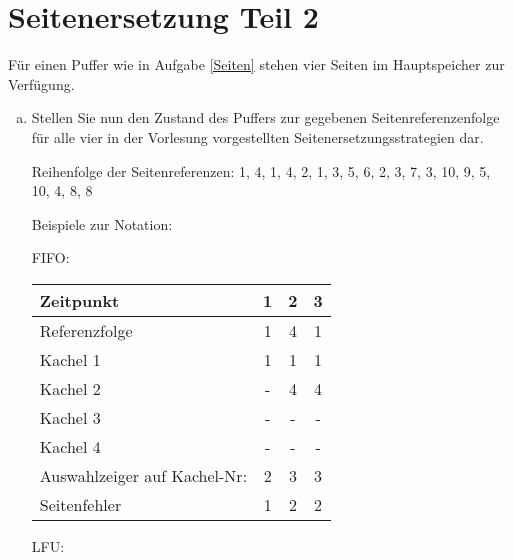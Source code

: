 \section{Seitenersetzung Teil 2}
Für einen Puffer wie in Aufgabe \ref{Seiten} stehen vier Seiten im Hauptspeicher zur Verfügung.
\begin{enumerate}[a)]
	\item Stellen Sie nun den Zustand des Puffers zur gegebenen Seitenreferenzenfolge für alle vier in der Vorlesung vorgestellten Seitenersetzungsstrategien dar.

	Reihenfolge der Seitenreferenzen: 1, 4, 1, 4, 2, 1, 3, 5, 6, 2, 3, 7, 3, 10, 9, 5, 10, 4, 8, 8

\begin{normalText}
	Beispiele zur Notation:


	\begin{minipage}{.49\textwidth}
		FIFO:

		\vspace{.25cm}

		\begin{tabular}{|p{4.3cm}||c|c|c|}
			\hline
			\rowcolor{gray} Zeitpunkt & 1 & 2 & 3 \\
			\hline
			\rowcolor{gray} Referenzfolge & 1 & 4 & 1 \\
			\hline \hline
			Kachel 1 & 1 & 1 & 1 \\
			\hline
			Kachel 2 & - & 4 & 4 \\
			\hline
			Kachel 3 & - & - & - \\
			\hline
			Kachel 4 & - & - & - \\
			\hline \hline
			\rowcolor{lightgray} \raggedright Auswahlzeiger auf Kachel-Nr: & 2 & 3 & 3 \\
			\hline\hline
			\rowcolor{gray} Seitenfehler & 1 & 2 & 2 \\
			\hline
		\end{tabular}
	\end{minipage}
	\begin{minipage}{.45\textwidth}
		LFU:

		\vspace{.25cm}


\end{minipage}
\end{normalText}
\end{enumerate}
